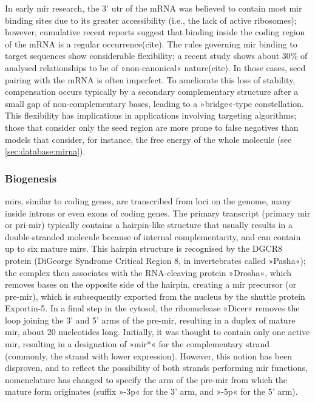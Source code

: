 In early \ac{mir} research, the 3' \ac{utr} of the mRNA was believed to contain most \ac{mir} binding sites due to its greater accessibility (i.e., the lack of active ribosomes); however, cumulative recent reports suggest that binding inside the coding region of the mRNA is a regular occurrence(cite). The rules governing \ac{mir} binding to target sequences show considerable flexibility; a recent study shows about 30\% of analysed relationships to be of »non-canonical« nature(cite). In those cases, seed pairing with the mRNA is often imperfect. To ameliorate this loss of stability, compensation occurs typically by a secondary complementary structure after a small gap of non-complementary bases, leading to a »bridge«-type constellation.  This flexibility has implications in applications involving targeting algorithms; those that consider only the seed region are more prone to false negatives than models that consider, for instance, the free energy of the whole molecule (see \ref{sec:database:mirna}).

\subsubsection{Biogenesis}
\acp{mir}, similar to coding genes, are transcribed from loci on the genome, many inside introns or even exons of coding genes\cite{Rodriguez2004}. The primary transcript (primary \ac{mir} or pri-\ac{mir}) typically contains a hairpin-like structure that usually results in a double-stranded molecule because of internal complementarity, and can contain up to six mature \acp{mir}. This hairpin structure is recognised by the DGCR8 protein (DiGeorge Syndrome Critical Region 8, in invertebrates called »Pasha«); the complex then associates with the RNA-cleaving protein »Drosha«, which removes bases on the opposite side of the hairpin, creating a \ac{mir} precursor (or pre-\ac{mir}), which is subsequently exported from the nucleus by the shuttle protein Exportin-5. In a final step in the cytosol, the ribonuclease »Dicer« removes the loop joining the 3' and 5' arms of the pre-\ac{mir}, resulting in a duplex of mature \ac{mir}, about 20 nucleotides long. Initially, it was thought to contain only one active \ac{mir}, resulting in a designation of »\ac{mir}*« for the complementary strand (commonly, the strand with lower expression). However, this notion has been disproven, and to reflect the possibility of both strands performing \ac{mir} functions, nomenclature has changed to specify the arm of the pre-\ac{mir} from which the mature form originates (suffix »-3p« for the 3' arm, and »-5p« for the 5' arm).

